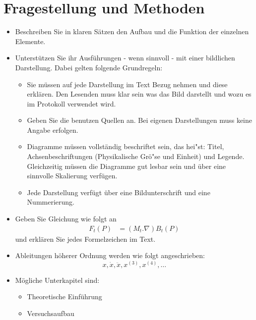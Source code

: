\section*{Fragestellung und Methoden}
\begin{itemize}
    \item Beschreiben Sie in klaren S\"atzen den Aufbau und die Funktion der einzelnen Elemente. 
    \item Unterst\"utzen Sie ihr Ausf\"uhrungen - wenn sinnvoll - mit einer bildlichen Darstellung. Dabei gelten folgende Grundregeln:
    \begin{itemize}
        \item Sie m\"ussen auf jede Darstellung im Text Bezug nehmen und diese erkl\"aren. Den Lesenden muss klar sein was das Bild darstellt und wozu es im Protokoll verwendet wird.
        \item Geben Sie die benutzen Quellen an. Bei eigenen Darstellungen muss keine Angabe erfolgen.
        \item Diagramme m\"ussen vollst\"andig beschriftet sein, das hei"st: Titel, Achsenbeschriftungen (Physikalische Gr\"o"se und Einheit) und Legende. Gleichzeitig m\"ussen die Diagramme gut lesbar sein und \"uber eine sinnvolle Skalierung verf\"ugen. 
        \item Jede Darstellung verf\"ugt \"uber eine Bildunterschrift und eine Nummerierung. 
     \end{itemize}
     \item Geben Sie Gleichung wie folgt an
     \begin{align}
   			 F_t(P) & = (M_t.\nabla)B_t(P)
   		 	\label{eq:equation1}
	\end{align}
 	und erklären Sie jedes Formelzeichen im Text.
 	\item Ableitungen höherer Ordnung werden wie folgt angeschrieben:
 	\begin{equation}
 		x, \dot{x}, \ddot{x}, x^{\left(3\right)}, x^{\left(4\right)}, \dots
 	\end{equation}
 	\item Mögliche Unterkapitel sind:
 	\begin{itemize}
 		\item Theoretische Einführung
 		\item Versuchsaufbau
 	\end{itemize}
\end{itemize}